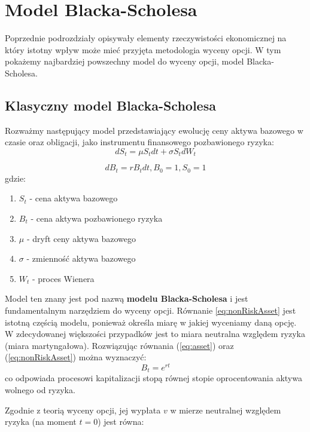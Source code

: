 \documentclass{pracamgr}
\begin{document}
\section{Model Blacka-Scholesa}

Poprzednie podrozdziały opisywały elementy rzeczywistości ekonomicznej na który istotny wpływ może 
mieć przyjęta metodologia wyceny opcji. W tym pokażemy najbardziej powszechny model do wyceny opcji, 
model Blacka-Scholesa. 
\subsection{Klasyczny model Blacka-Scholesa} %
\label{sub:subsection_name}

Rozważmy następujący model przedstawiający ewolucję ceny aktywa
bazowego w czasie oraz obligacji, jako instrumentu finansowego pozbawionego ryzyka:
\begin{equation}
  \label{eq:asset}
  dS_t = \mu S_t dt + \sigma S_t d W_t 
\end{equation}

\begin{equation}
  \label{eq:nonRiskAsset}
  dB_t = r B_t dt, B_0 = 1, S_0 = 1
\end{equation}
gdzie:
\begin{enumerate}
  \item $S_t$ - cena aktywa bazowego
  \item $B_t$ - cena aktywa pozbawionego ryzyka
  \item $\mu$ - dryft ceny aktywa bazowego
  \item $\sigma$ - zmienność aktywa bazowego
  \item $W_t$ - proces Wienera
\end{enumerate}


Model ten znany jest pod nazwą \textbf{modelu Blacka-Scholesa} i jest fundamentalnym 
narzędziem do wyceny opcji. Równanie \ref{eq:nonRiskAsset}  jest istotną częścią modelu, ponieważ 
określa miarę w jakiej wyceniamy daną opcję. W zdecydowanej większości przypadków jest to miara 
neutralna względem ryzyka (miara martyngałowa). 
Rozwiązując równania (\ref{eq:asset}) oraz (\ref{eq:nonRiskAsset}) można wyznaczyć:
\begin{equation}
B_t = e^{rt}
\end{equation}
co odpowiada procesowi kapitalizacji stopą równej stopie oprocentowania aktywa wolnego od ryzyka.

Zgodnie z teorią wyceny opcji, jej wypłata $v$ w mierze neutralnej względem ryzyka (na moment $t = 0$) 
jest równa:
\end{document}

